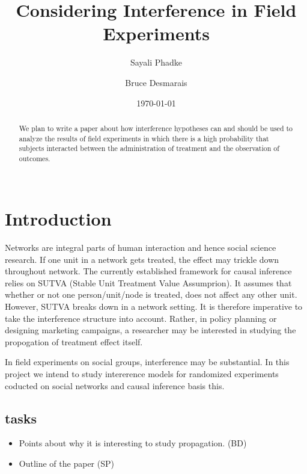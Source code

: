 \documentclass[12pt]{article}
\title{\vspace{-2cm} Considering Interference in Field Experiments }
\author{ Sayali Phadke \and Bruce Desmarais} \date{\today}
\begin{document}
\maketitle




\begin{abstract}

 \noindent  We plan to write a paper about how interference hypotheses can and should be used to analyze the results of field experiments in which there is a high probability that subjects interacted between the administration of treatment and the observation of outcomes. \\~\\

\end{abstract}
\thispagestyle{empty}
\doublespacing
\section{Introduction}

Networks are integral parts of human interaction and hence social science research. If one unit in a network gets treated, the effect may trickle down throughout network. The currently established framework for causal inference relies on SUTVA (Stable Unit Treatment Value Assumprion). It assumes that whether or not one person/unit/node is treated, does not affect any other unit. However, SUTVA breaks down in a network setting. It is therefore imperative to take the interference structure into account. Rather, in policy planning or designing marketing campaigns, a researcher may be interested in studying the propogation of treatment effect itself.

In field experiments on social groups, interference may be substantial. In this project we intend to study intererence models for randomized experiments coducted on social networks and causal inference basis this.

\subsection{tasks}
\begin{itemize}
\item Points about why it is interesting to study propagation. (BD)
\item Outline of the paper (SP)
\end{itemize}
\end{document}
